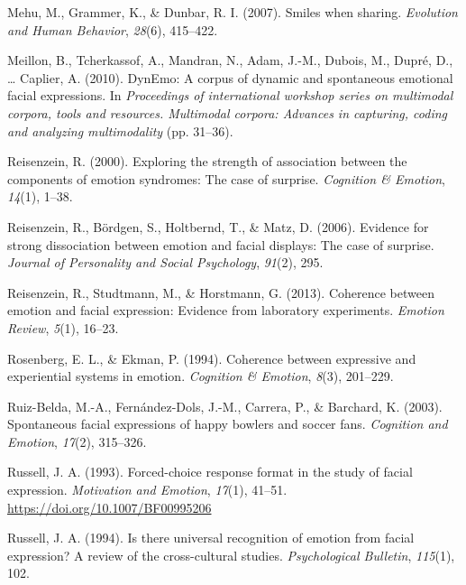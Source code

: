 \documentclass[man]{apa6}
\begin{document}
\leavevmode\hypertarget{ref-mehu2007smiles}{}%
Mehu, M., Grammer, K., \& Dunbar, R. I. (2007). Smiles when sharing. \emph{Evolution and Human Behavior}, \emph{28}(6), 415--422.

\leavevmode\hypertarget{ref-meillon2010dynemo}{}%
Meillon, B., Tcherkassof, A., Mandran, N., Adam, J.-M., Dubois, M., Dupré, D., \ldots{} Caplier, A. (2010). DynEmo: A corpus of dynamic and spontaneous emotional facial expressions. In \emph{Proceedings of international workshop series on multimodal corpora, tools and resources. Multimodal corpora: Advances in capturing, coding and analyzing multimodality} (pp. 31--36).

\leavevmode\hypertarget{ref-reisenzein2000exploring}{}%
Reisenzein, R. (2000). Exploring the strength of association between the components of emotion syndromes: The case of surprise. \emph{Cognition \& Emotion}, \emph{14}(1), 1--38.

\leavevmode\hypertarget{ref-reisenzein2006evidence}{}%
Reisenzein, R., Bördgen, S., Holtbernd, T., \& Matz, D. (2006). Evidence for strong dissociation between emotion and facial displays: The case of surprise. \emph{Journal of Personality and Social Psychology}, \emph{91}(2), 295.

\leavevmode\hypertarget{ref-reisenzein2013coherence}{}%
Reisenzein, R., Studtmann, M., \& Horstmann, G. (2013). Coherence between emotion and facial expression: Evidence from laboratory experiments. \emph{Emotion Review}, \emph{5}(1), 16--23.

\leavevmode\hypertarget{ref-rosenberg1994coherence}{}%
Rosenberg, E. L., \& Ekman, P. (1994). Coherence between expressive and experiential systems in emotion. \emph{Cognition \& Emotion}, \emph{8}(3), 201--229.

\leavevmode\hypertarget{ref-ruiz2003spontaneous}{}%
Ruiz-Belda, M.-A., Fernández-Dols, J.-M., Carrera, P., \& Barchard, K. (2003). Spontaneous facial expressions of happy bowlers and soccer fans. \emph{Cognition and Emotion}, \emph{17}(2), 315--326.

\leavevmode\hypertarget{ref-russell1993forced}{}%
Russell, J. A. (1993). Forced-choice response format in the study of facial expression. \emph{Motivation and Emotion}, \emph{17}(1), 41--51. \url{https://doi.org/10.1007/BF00995206}

\leavevmode\hypertarget{ref-russell1994there}{}%
Russell, J. A. (1994). Is there universal recognition of emotion from facial expression? A review of the cross-cultural studies. \emph{Psychological Bulletin}, \emph{115}(1), 102.
\end{document}
